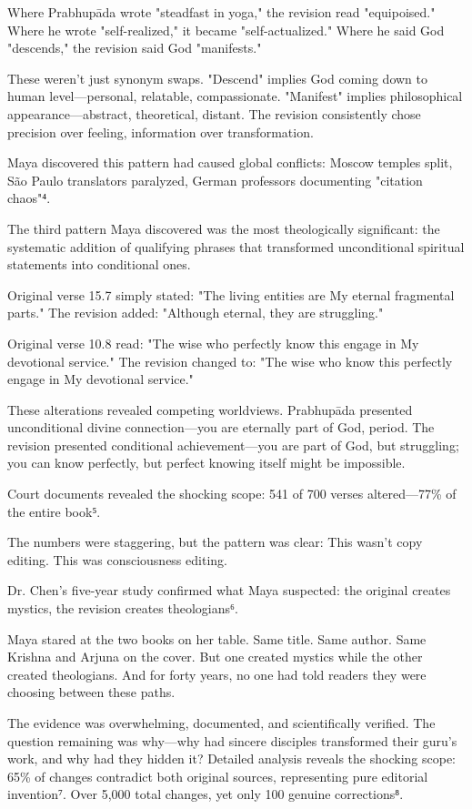 \documentclass[11pt,twoside]{book}
\begin{document}
Where Prabhupāda wrote "steadfast in yoga," the revision read "equipoised." Where he wrote "self-realized," it became "self-actualized." Where he said God "descends," the revision said God "manifests." 

These weren't just synonym swaps. "Descend" implies God coming down to human level—personal, relatable, compassionate. "Manifest" implies philosophical appearance—abstract, theoretical, distant. The revision consistently chose precision over feeling, information over transformation.

Maya discovered this pattern had caused global conflicts: Moscow temples split, São Paulo translators paralyzed, German professors documenting "citation chaos"⁴.

The third pattern Maya discovered was the most theologically significant: the systematic addition of qualifying phrases that transformed unconditional spiritual statements into conditional ones.

Original verse 15.7 simply stated: "The living entities are My eternal fragmental parts."
The revision added: "Although eternal, they are struggling."

Original verse 10.8 read: "The wise who perfectly know this engage in My devotional service."
The revision changed to: "The wise who know this perfectly engage in My devotional service."

These alterations revealed competing worldviews. Prabhupāda presented unconditional divine connection—you are eternally part of God, period. The revision presented conditional achievement—you are part of God, but struggling; you can know perfectly, but perfect knowing itself might be impossible.

Court documents revealed the shocking scope: 541 of 700 verses altered—77\% of the entire book⁵.

The numbers were staggering, but the pattern was clear: This wasn't copy editing. This was consciousness editing.

Dr. Chen's five-year study confirmed what Maya suspected: the original creates mystics, the revision creates theologians⁶.

Maya stared at the two books on her table. Same title. Same author. Same Krishna and Arjuna on the cover. But one created mystics while the other created theologians. And for forty years, no one had told readers they were choosing between these paths.

The evidence was overwhelming, documented, and scientifically verified. The question remaining was why—why had sincere disciples transformed their guru's work, and why had they hidden it?
Detailed analysis reveals the shocking scope: 65\% of changes contradict both original sources, representing pure editorial invention⁷. Over 5,000 total changes, yet only 100 genuine corrections⁸.
\end{document}
